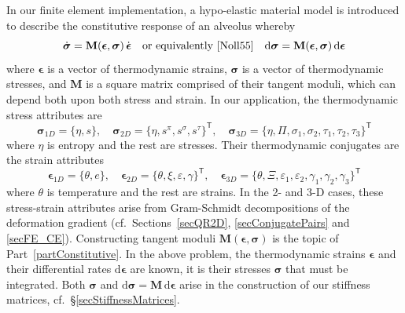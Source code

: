 In our finite element implementation, a hypo-elastic material model \cite{Truesdell55} is introduced to describe the constitutive response of an alveolus whereby
\begin{displaymath}
    \dot{\boldsymbol{\sigma}} = \mathbf{M} ( \boldsymbol{\epsilon} , \boldsymbol{\sigma} ) \, \dot{\boldsymbol{\epsilon}} 
    \quad \text{or equivalently \cite{Noll55}} \quad
    \mathrm{d} \boldsymbol{\sigma} = \mathbf{M} ( \boldsymbol{\epsilon} , \boldsymbol{\sigma} ) \, \mathrm{d} \boldsymbol{\epsilon}
\end{displaymath} 
where $\boldsymbol{\epsilon}$ is a vector of thermo\-dynamic strains, $\boldsymbol{\sigma}$ is a vector of thermo\-dynamic stresses, and $\mathbf{M}$ is a square matrix comprised of their tangent moduli, which can depend both upon both stress and strain.  In our application, the thermo\-dynamic stress attributes are 
\begin{displaymath}
   \boldsymbol{\sigma}_{1D} = \{ \eta , s \} , \quad
   \boldsymbol{\sigma}_{2D} = \{ \eta , s^{\pi} , s^{\sigma} , s^{\tau} \}^{\mathsf{T}} , \quad
   \boldsymbol{\sigma}_{3D} = \{ \eta , \Pi , \sigma_1 , \sigma_2 , \tau_1 , \tau_2 , \tau_3 \}^{\mathsf{T}}
\end{displaymath}
where $\eta$ is entropy and the rest are stresses.  Their thermo\-dynamic conjugates are the strain attributes
\begin{displaymath}
\boldsymbol{\epsilon}_{1D} = \{ \theta , e \} , \quad
\boldsymbol{\epsilon}_{2D} = \{ \theta , \xi , \varepsilon , \gamma \}^{\mathsf{T}} , \quad
\boldsymbol{\epsilon}_{3D} = \{ \theta , \Xi , \varepsilon_1 , \varepsilon_2 , \gamma_1 , \gamma_2 , \gamma_3 \}^{\mathsf{T}}
\end{displaymath}
where $\theta$ is temperature and the rest are strains.  In the 2- and 3-D cases, these stress-strain attributes arise from Gram-Schmidt decompositions of the deformation gradient (cf.\ Sections~\ref{secQR2D}, \ref{secConjugatePairs} and \ref{secFE_CE}).  Constructing tangent moduli $\mathbf{M} ( \boldsymbol{\epsilon} , \boldsymbol{\sigma} )$ is the topic of Part~\ref{partConstitutive}.  In the above problem, the thermo\-dynamic strains $\boldsymbol{\epsilon}$ and their differential rates $\mathrm{d} \boldsymbol{\epsilon}$ are known, it is their stresses $\boldsymbol{\sigma}$ that must be integrated.  Both $\boldsymbol{\sigma}$ and $\mathrm{d} \boldsymbol{\sigma} = \mathbf{M} \, \mathrm{d} \boldsymbol{\epsilon}$ arise in the construction of our stiffness matrices, cf.\ \S\ref{secStiffnessMatrices}.


